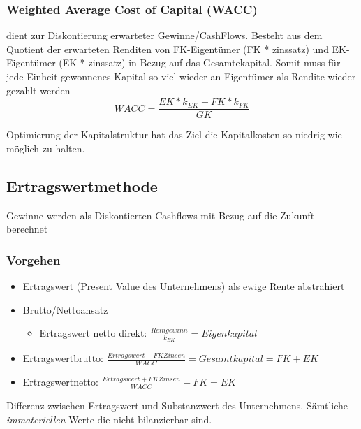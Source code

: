 \subsubsection{Weighted Average Cost of Capital (WACC)}
\begin{definition}
    [WACC] dient zur Diskontierung erwarteter Gewinne/CashFlows. Besteht aus dem Quotient der erwarteten Renditen von FK-Eigentümer (FK * zinssatz) und EK-Eigentümer (EK * zinssatz) in Bezug auf das Gesamtekapital. Somit muss für jede Einheit gewonnenes Kapital so viel wieder an Eigentümer als Rendite wieder gezahlt werden
    \begin{equation}
        WACC = \frac{EK * k_{EK} + FK * k_{FK} }{GK}
    \end{equation}
\end{definition}

Optimierung der Kapitalstruktur hat das Ziel die Kapitalkosten so niedrig wie möglich zu halten.

\subsection{Ertragswertmethode}

\begin{definition}
    [Ertragswertmethode] Gewinne werden als Diskontierten Cashflows mit Bezug auf die Zukunft berechnet
\end{definition}

\subsubsection{Vorgehen}
\begin{itemize}
    \item Ertragswert (Present Value des Unternehmens) als ewige Rente abstrahiert 
    \item Brutto/Nettoansatz
    \begin{itemize}
        \item Ertragswert netto direkt: $\frac{Reingewinn}{k_{EK}} = Eigenkapital$ 
    \end{itemize}
    \item Ertragswertbrutto: $\frac{Ertragswert + FKZinsen}{WACC} = Gesamtkapital = FK + EK $
    \item Ertragswertnetto: $\frac{Ertragswert + FKZinsen}{WACC} - FK = EK$
\end{itemize}

\begin{definition}
    [Goodwill] Differenz zwischen Ertragswert und Substanzwert des Unternehmens. Sämtliche \textit{immateriellen} Werte die nicht bilanzierbar sind.
\end{definition}

